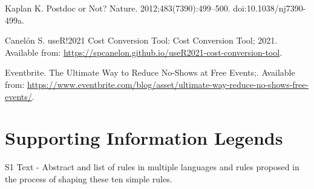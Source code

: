\documentclass[10pt,letterpaper]{article}
\begin{document}
\begin{thebibliography}{10}
Kaplan K.
\newblock Postdoc or Not?
\newblock Nature. 2012;483(7390):499--500.
\newblock doi:{10.1038/nj7390-499a}.

Canelón S. useR!2021 Cost Conversion Tool: Cost Conversion Tool; 2021.
\newblock Available from:
  \url{https://spcanelon.github.io/useR2021-cost-conversion-tool}.

{Eventbrite}. The Ultimate Way to Reduce No-Shows at Free Events;.
\newblock Available from:
  \url{https://www.eventbrite.com/blog/asset/ultimate-way-reduce-no-shows-free-events/}.

\end{thebibliography}

\section*{Supporting Information Legends}

S1 Text - Abstract and list of rules in multiple languages
and rules proposed in the process of shaping these ten simple rules.
\end{document}
